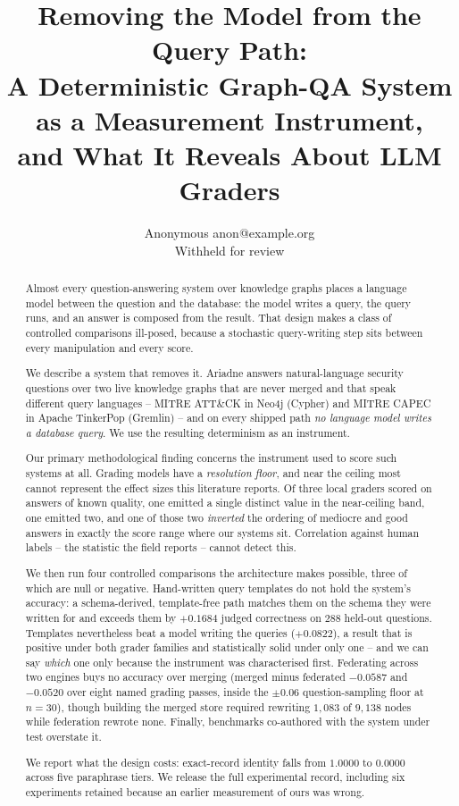 \documentclass{article}
\title{Removing the Model from the Query Path:\\
A Deterministic Graph-QA System as a Measurement Instrument,\\
and What It Reveals About LLM Graders}
\author{\name Anonymous \email anon@example.org \\
        \addr Withheld for review}
\begin{document}
\maketitle

\begin{abstract}
Almost every question-answering system over knowledge graphs places a language
model between the question and the database: the model writes a query, the query
runs, and an answer is composed from the result. That design makes a class of
controlled comparisons ill-posed, because a stochastic query-writing step sits
between every manipulation and every score.

We describe a system that removes it. Ariadne answers natural-language security
questions over two live knowledge graphs that are never merged and that speak
different query languages -- MITRE ATT\&CK in Neo4j (Cypher) and MITRE CAPEC in
Apache TinkerPop (Gremlin) -- and on every shipped path \emph{no language model
writes a database query}. We use the resulting determinism as an instrument.

Our primary methodological finding concerns the instrument used to score such
systems at all. Grading models have a \emph{resolution floor}, and near the
ceiling most cannot represent the effect sizes this literature reports. Of three
local graders scored on answers of known quality, one emitted a single distinct
value in the near-ceiling band, one emitted two, and one of those two
\emph{inverted} the ordering of mediocre and good answers in exactly the score
range where our systems sit. Correlation against human labels -- the statistic
the field reports -- cannot detect this.

We then run four controlled comparisons the architecture makes possible, three of
which are null or negative. Hand-written query templates do not hold the system's
accuracy: a schema-derived, template-free path matches them on the schema they
were written for and exceeds them by $+0.1684$ judged correctness on $288$
held-out questions. Templates nevertheless beat a model writing the queries
($+0.0822$), a result that is positive under both grader families and
statistically solid under only one -- and we can say \emph{which} one only
because the instrument was characterised first. Federating across two engines
buys no accuracy over merging (merged minus federated $-0.0587$ and $-0.0520$
over eight named grading passes, inside the $\pm 0.06$ question-sampling floor
at $n{=}30$), though building the
merged store required rewriting $1{,}083$ of $9{,}138$ nodes while federation
rewrote none. Finally, benchmarks co-authored with the system under test
overstate it.

We report what the design costs: exact-record identity falls from $1.0000$ to
$0.0000$ across five paraphrase tiers. We release the full experimental record,
including six experiments retained because an earlier measurement of ours was
wrong.
\end{abstract}
\end{document}
